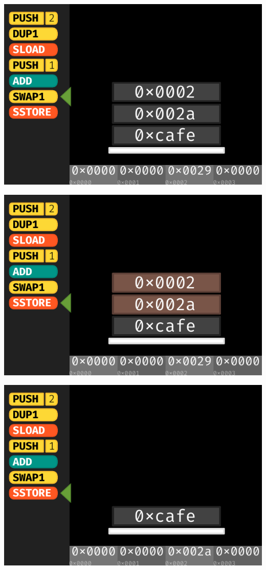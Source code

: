 \documentclass[xcolor=x11names,compress]{beamer}
\begin{document}
\begin{frame}
\begin{overprint}
\begin{center}
		\end{center}
		\begin{center}
			\includegraphics[width=\textwidth,height=0.8\textheight,keepaspectratio]{img/stackmachine/12.pdf}
		\end{center}
		\begin{center}
			\includegraphics[width=\textwidth,height=0.8\textheight,keepaspectratio]{img/stackmachine/13.pdf}
		\end{center}
		\begin{center}
			\includegraphics[width=\textwidth,height=0.8\textheight,keepaspectratio]{img/stackmachine/14.pdf}

\end{center}
\end{overprint}
\end{frame}
\end{document}
